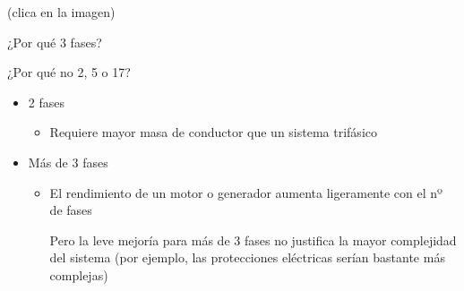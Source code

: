 \documentclass[aspectratio=169, usenames,svgnames,dvipsnames]{beamer}
\begin{document}

\begin{frame}{}
    \vspace{2mm}
    (\alert{clica en la imagen})

    \vspace{2mm}
    \begin{center}
    \end{center}
\end{frame}


\begin{frame}{¿Por qué 3 fases?}

    ¿Por qué no 2, 5 o 17?
    
    \vspace{6mm}
    
    \begin{itemize}
        \item 2 fases 
        \begin{itemize}
            \vspace{2mm}
            \item \normalsize Requiere \alert{mayor masa de conductor} que un sistema trifásico
            
        \end{itemize}

        \vspace{4mm}
        \item Más de 3 fases

        \vspace{2mm}
        \begin{itemize}  
            \item \normalsize El rendimiento de un motor o generador aumenta ligeramente con el nº de fases 

            \vspace{2mm}
            Pero la leve mejoría para más de 3 fases \alert{no justifica la mayor complejidad} del sistema (por ejemplo, las protecciones eléctricas serían bastante más complejas)  
        \end{itemize}
    \end{itemize}
\end{frame}
\end{document}
